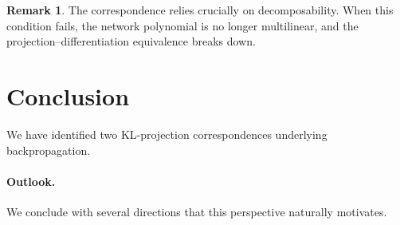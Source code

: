 \documentclass[12pt]{article}
\newcommand{\1}{\mathbb{1}}
\theoremstyle{definition}
\newtheorem{remark}[theorem]{Remark}
\begin{document}
\begin{remark}
The correspondence relies crucially on decomposability. When this condition fails, the network polynomial is no longer multilinear, and the projection--differentiation equivalence breaks down.
\end{remark}


\section{Conclusion}
\label{sec:discussion}

We have identified two KL-projection correspondences underlying backpropagation.

\paragraph{Outlook.}
We conclude with several directions that this perspective naturally motivates.
\end{document}
